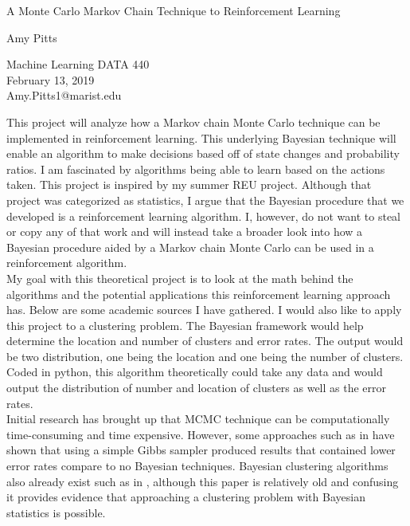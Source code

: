 \documentclass[a4paper]{article}
\begin{document}

\Large
 \begin{center}
A Monte Carlo Markov Chain Technique to Reinforcement Learning
\hspace{10pt}

\large
Amy Pitts
\\

\hspace{10pt}

\small 
Machine Learning DATA 440 \\ 
February 13, 2019 \\
Amy.Pitts1@marist.edu\\

\end{center}

\hspace{10pt}

\normalsize

\indent This project will analyze how a Markov chain Monte Carlo
technique can be implemented in reinforcement learning. This 
underlying Bayesian technique will enable an algorithm to make 
decisions based off of state changes and probability ratios.  
I am fascinated by algorithms being able to learn based on the 
actions taken. This project is inspired by my summer REU project. 
Although that project was categorized as statistics, I argue that
the Bayesian procedure that we developed is a reinforcement 
learning algorithm.  I, however, do not want to steal or copy 
any of that work and will instead take a broader look into how a 
Bayesian procedure aided by a Markov chain Monte Carlo can be 
used in a reinforcement algorithm. \\ 
\indent My goal with this theoretical project is to look at the 
math behind the algorithms and the potential applications this 
reinforcement learning approach has.  Below are some academic 
sources I have gathered. I would also like to apply this project 
to a clustering problem. The Bayesian framework would help 
determine the location and number of clusters and error rates.  
The output would be two distribution, one being the location 
and one being the number of clusters. Coded in python, this 
algorithm theoretically could take any data and would output 
the distribution of number and location of clusters as well 
as the error rates. \\
\indent Initial research has brought up that MCMC technique can 
be computationally time-consuming and time expensive. However, 
some approaches such as in \cite{Salakhutdinov08} have shown 
that using a simple Gibbs sampler produced results that 
contained lower error rates compare to no Bayesian techniques.  
Bayesian clustering algorithms also already exist such as 
in \cite{Binder78}, although this paper is relatively old 
and confusing it provides evidence that approaching a 
clustering problem with Bayesian statistics is possible.   
	
\end{document}
